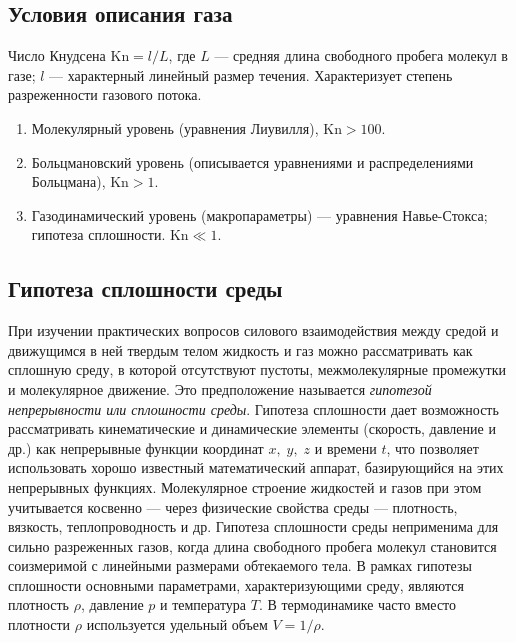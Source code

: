 	\subsection{Условия описания газа}
	Число Кнудсена $\text{Kn}=l/L$, где $L$ --- средняя длина свободного пробега молекул в газе; $l$ --- характерный линейный размер течения. Характеризует степень разреженности газового потока. 
	\begin{enumerate}
		\item Молекулярный уровень (уравнения Лиувилля), $\text{Kn}>100$.
		\item Больцмановский уровень (описывается уравнениями и распределениями Больцмана), $\text{Kn}>1$.
		\item Газодинамический уровень (макропараметры) --- уравнения Навье-Стокса; гипотеза сплошности. $\text{Kn}\ll1$.
	\end{enumerate}
	
	\subsection{Гипотеза сплошности среды}
	При изучении практических вопросов силового взаимодействия между средой и движущимся в ней твердым телом жидкость и газ можно рассматривать как сплошную среду, в которой отсутствуют пустоты, межмолекулярные промежутки и молекулярное движение. Это предположение называется \textit{гипотезой непрерывности или сплошности среды}.\n
	Гипотеза сплошности дает возможность рассматривать кинематические и динамические элементы (скорость, давление и др.) как непрерывные функции координат $x,\; y,\; z$ и времени $t$, что позволяет использовать хорошо известный математический аппарат, базирующийся на этих непрерывных функциях. Молекулярное строение жидкостей и газов при этом учитывается косвенно --- через физические свойства среды --- плотность, вязкость, теплопроводность и др.\n
	Гипотеза сплошности среды неприменима для сильно разреженных газов, когда длина свободного пробега молекул становится соизмеримой с линейными размерами обтекаемого тела.\n
	В рамках гипотезы сплошности основными параметрами, характеризующими среду, являются плотность $\rho$, давление $p$ и температура $T$. В термодинамике часто вместо плотности $\rho$ используется удельный объем $V = 1/\rho$.
	
